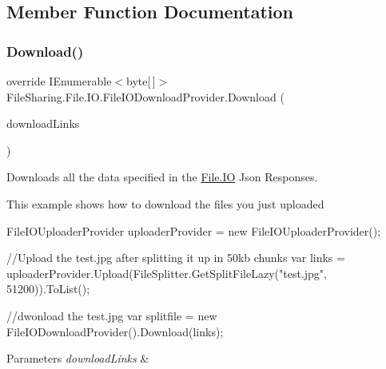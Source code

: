 \subsection{Member Function Documentation}
\mbox{\label{class_file_sharing_1_1_file_1_1_i_o_1_1_file_i_o_download_provider_a20619028413c369ac0cc064b610d5c0e}} 
\subsubsection{\texorpdfstring{Download()}{Download()}}
{\footnotesize\ttfamily override I\+Enumerable$<$byte\mbox{[}$\,$\mbox{]}$>$ File\+Sharing.\+File.\+I\+O.\+File\+I\+O\+Download\+Provider.\+Download (\begin{DoxyParamCaption}\item[{I\+Enumerable$<$ string $>$}]{download\+Links }\end{DoxyParamCaption})\hspace{0.3cm}{\ttfamily [virtual]}}



Downloads all the data specified in the \hyperlink{namespace_file_sharing_1_1_file_1_1_i_o}{File.\+IO} Json Responses. 

This example shows how to download the files you just uploaded 
\begin{DoxyCode}
FileIOUploaderProvider uploaderProvider = \textcolor{keyword}{new} FileIOUploaderProvider();

\textcolor{comment}{//Upload the test.jpg after splitting it up in 50kb chunks}
var links = uploaderProvider.Upload(FileSplitter.GetSplitFileLazy(\textcolor{stringliteral}{"test.jpg"}, 51200)).ToList();

\textcolor{comment}{//dwonload the test.jpg}
var splitfile = \textcolor{keyword}{new} FileIODownloadProvider().Download(links);
\end{DoxyCode}
 


\begin{DoxyParams}{Parameters}
{\em download\+Links} & \\
\hline
\end{DoxyParams}


